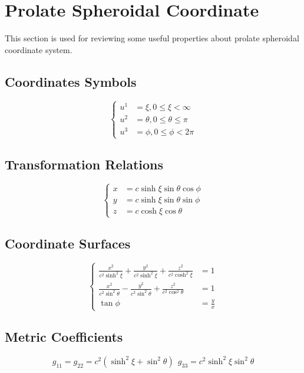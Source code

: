 \documentclass[fontsize=11pt, %
                             paper=a4, %
                             twoside, %
                             captions=tableheading,
                             index=totoc,
                             hyperref]{labbook}
\begin{document}
\section{Prolate Spheroidal Coordinate}
This section is used for reviewing some useful properties about prolate spheroidal coordinate system.\cite{MoonSpencer1988}
\subsection{Coordinates Symbols}
\begin{equation}
\left\{
\begin{aligned}
u^1&=\xi , 0\le\xi<\infty\\
u^2&=\theta,0\le\theta\le\pi\\
u^3&=\phi,0\le\phi<2\pi
\end{aligned}
\right.
\end{equation}
\subsection{Transformation Relations}
\begin{equation}
\left\{
\begin{aligned}
x&=c\sinh\xi\sin\theta\cos\phi\\
y&=c\sinh\xi\sin\theta\sin\phi\\
z&=c\cosh\xi\cos\theta
\end{aligned}
\right.
\end{equation}
\subsection{Coordinate Surfaces}
\begin{equation}
\left\{
\begin{aligned}
\frac{x^2}{c^2\sinh^2\xi}+\frac{y^2}{c^2\sinh^2\xi}+\frac{z^2}{c^2\cosh^2\xi}&=1\\
\frac{x^2}{c^2\sin^2\theta}-\frac{y^2}{c^2\sin^2\theta}+\frac{z^2}{c^2\cos^2\theta}&=1\\
\tan\phi&=\frac{y}{x}
\end{aligned}
\right.
\end{equation}
\subsection{Metric Coefficients}
\begin{equation}
g_{11}=g_{22}=c^2(\sinh^2\xi+\sin^2\theta)\ \ g_{33}=c^2\sinh^2\xi\sin^2\theta
\end{equation}
\end{document}
